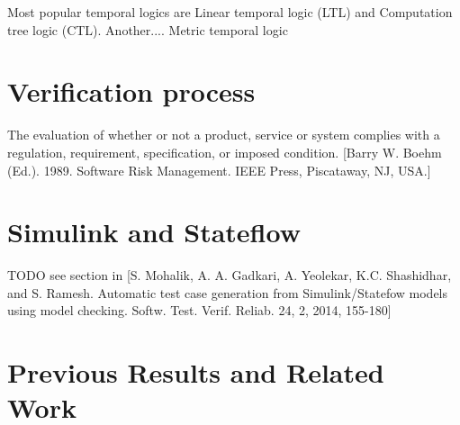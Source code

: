 Most popular temporal logics are Linear temporal logic (LTL) and Computation tree logic (CTL). Another....  Metric temporal logic

\section{Verification process}

The evaluation of whether or not a product, service or system complies with a regulation, requirement, specification, or imposed condition. [Barry W. Boehm (Ed.). 1989. Software Risk Management. IEEE Press, Piscataway, NJ, USA.]

\section{Simulink and Stateflow}

TODO see section in [S. Mohalik, A. A. Gadkari, A. Yeolekar, K.C. Shashidhar, and S. Ramesh. Automatic test case generation from Simulink/Statefow models using model checking. Softw. Test. Verif. Reliab. 24, 2, 2014, 155-180]

\section{Previous Results and Related Work}
%